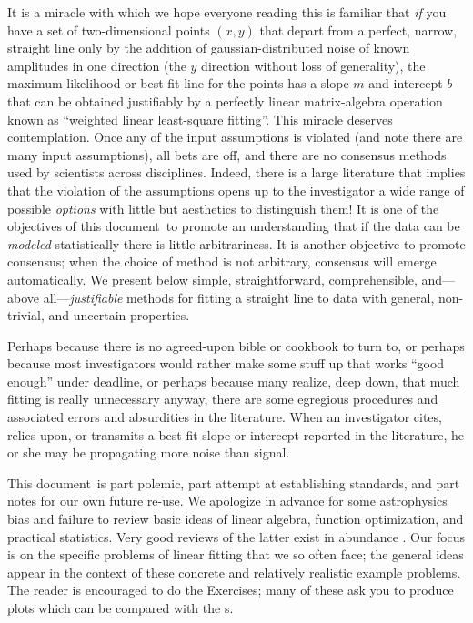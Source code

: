 \documentclass[12pt,twoside]{article}
\newcommand{\documentname}{document}
\newcommand{\problemname}{Exercise}
\newcounter{problem}
\begin{document}
It is a miracle with which we hope everyone reading this is familiar
that \emph{if} you have a set of two-dimensional points $(x,y)$ that
depart from a perfect, narrow, straight line only by the addition of
gaussian-distributed noise of known amplitudes in one direction (the
$y$ direction without loss of generality), the maximum-likelihood or
best-fit line for the points has a slope $m$ and intercept $b$ that
can be obtained justifiably by a perfectly linear matrix-algebra
operation known as ``weighted linear least-square fitting''.  This
miracle deserves contemplation.  Once any of the input assumptions is
violated (and note there are many input assumptions), all bets are
off, and there are no consensus methods used by scientists across
disciplines.  Indeed, there is a large literature that implies that
the violation of the assumptions opens up to the investigator a wide
range of possible \emph{options} with little but aesthetics to
distinguish them!  It is one of the objectives of this
\documentname\ to promote an understanding that if the data can be
\emph{modeled} statistically there is little arbitrariness.  It is
another objective to promote consensus; when the choice of method is
not arbitrary, consensus will emerge automatically.  We present below
simple, straightforward, comprehensible, and---above
all---\emph{justifiable} methods for fitting a straight line to data
with general, non-trivial, and uncertain properties.

Perhaps because there is no agreed-upon bible or cookbook to turn to,
or perhaps because most investigators would rather make some stuff up
that works ``good enough'' under deadline, or perhaps because many
realize, deep down, that much fitting is really unnecessary anyway,
there are some egregious procedures and associated errors and
absurdities in the literature.  When an investigator cites, relies upon,
or transmits a best-fit slope or intercept reported in the literature,
he or she may be propagating more noise than signal.

This \documentname\ is part polemic, part attempt at establishing standards,
and part notes for our own future re-use.  We apologize in advance for
some astrophysics bias and failure to review basic ideas of linear
algebra, function optimization, and practical statistics.  Very good
reviews of the latter exist in abundance \citep{mackay,press}.
Our focus is on the specific problems of linear fitting that we so
often face; the general ideas appear in the context of these concrete
and relatively realistic example problems.  The reader is encouraged
to do the \problemname s; many of these ask you to produce plots which
can be compared with the \figurename s.
\end{document}

